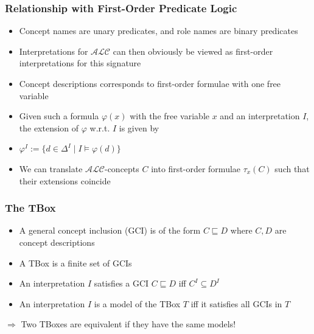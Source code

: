 \documentclass[conference, a4paper]{styles/acmsiggraph}
\begin{document}
        
    
    
        
        
        \subsubsection{Relationship with First-Order Predicate Logic}
            \begin{itemize}
                \item Concept names are unary predicates, and role names are binary predicates
                \item Interpretations for $\mathcal{ALC}$ can then obviously be viewed as first-order interpretations for this signature
                \item Concept descriptions corresponds to first-order formulae with one free variable
                \item Given such a formula $\varphi(x)$ with the free variable $x$ and an interpretation $I$, the extension of $\varphi$ w.r.t. $I$ is given by
                \item $\varphi^I := \{d \in \Delta^I \mid I \vDash \varphi(d)\}$
                \item We can translate $\mathcal{ALC}$-concepts $C$ into first-order formulae $\tau_x(C)$ such that their extensions coincide
            \end{itemize}
        
        \subsubsection{The TBox}
            \begin{itemize}
                \item A general concept inclusion (GCI) is of the form $C \sqsubseteq D$ where $C,D$ are concept descriptions
                \item A TBox is a finite set of GCIs
                \item An interpretation $I$ satisfies a GCI $C \sqsubseteq D$ iff $C^I \subseteq D^I$
                \item An interpretation $I$ is a model of the TBox $T$ iff it satisfies all GCIs in $T$
            \end{itemize}
            $\Rightarrow$ Two TBoxes are equivalent if they have the same models!
        
\end{document}
